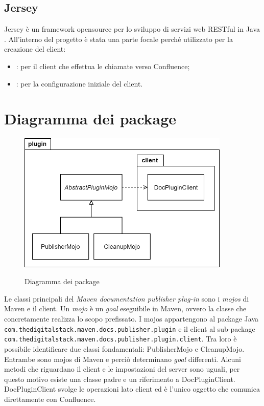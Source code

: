 \subsection{Jersey} %
Jersey è un framework opensource per lo sviluppo di servizi web RESTful in Java \cite{site:jersey}.
All'interno del progetto è stata una parte focale perché utilizzato per la creazione del client:
\begin{itemize}
    \item {}: per il client che effettua le chiamate verso Confluence;
    \item {}: per la configurazione iniziale del client.
\end{itemize}

\clearpage

\section{Diagramma dei package}
\label{sec:diagramma-package}
\begin{figure}[H]
    \centering
    \includegraphics[width=0.9\textwidth]{immagini/PackageDiagram.png}\\
    \caption{Diagramma dei package}
\end{figure}
Le classi principali del \emph{Maven documentation publisher plug-in} sono i \emph{mojos} di Maven e il client.
Un \emph{mojo} è un \emph{goal} eseguibile in Maven, ovvero la classe che concretamente realizza lo scopo prefissato.
I mojos appartengono al package Java \texttt{com.thedigitalstack.maven.docs.publisher.plugin} e il client al sub-package\\ \texttt{com.thedigitalstack.maven.docs.publisher.plugin.client}.
Tra loro è possibile identificare due classi fondamentali: PublisherMojo e CleanupMojo.
Entrambe sono mojos di Maven e perciò determinano \emph{goal} differenti.
Alcuni metodi che riguardano il client e le impostazioni del server sono uguali, per questo motivo esiste una classe padre e un riferimento a DocPluginClient.
DocPluginClient svolge le operazioni lato client ed è l'unico oggetto che comunica direttamente con Confluence.

